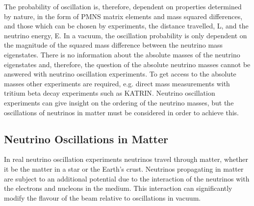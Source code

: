 The probability of oscillation is, therefore, dependent on properties determined
by nature, in the form of PMNS matrix elements and mass squared differences, and
those which can be chosen by experiments, the distance travelled, L, and the
neutrino energy, E. In a vacuum, the oscillation probability is only dependent 
on the magnitude of the squared mass difference between the neutrino mass
eigenstates. There is no information about the absolute masses of the 
neutrino eigenstates and, therefore,
the question of the absolute neutrino masses cannot be answered with neutrino 
oscillation experiments. To get access to the absolute masses other 
experiments are required, e.g. direct mass measurements with tritium beta 
decay experiments such as KATRIN\cite{Aker:2019qfn}. Neutrino oscillation 
experiments can give insight on the ordering of the neutrino masses, but
the oscillations of neutrinos in matter must be considered in order to achieve
this.

\subsection{Neutrino Oscillations in Matter}
In real neutrino oscillation experiments neutrinos travel through matter,
whether it be the matter in a star or the Earth's crust. Neutrinos propagating 
in matter are subject to an additional potential due to the interaction of the 
neutrinos with the electrons and nucleons in the medium. This interaction can 
significantly modify the flavour of the beam relative to oscillations in 
vacuum.

